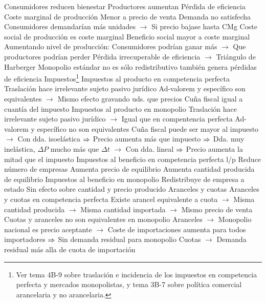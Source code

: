 \documentclass{nuevotema}
\begin{document}
\begin{esquemal}
				\4[] Consumidores reducen bienestar
				\4[] Productores aumentan
			\3 Pérdida de eficiencia
				\4 Coste marginal de producción
				\4[] Menor a precio de venta
				\4 Demanda no satisfecha
				\4[] Consumidores demandarían más unidades
				\4[] $\to$ Si precio bajase hasta CMg
				\4 Coste social de producción es coste marginal
				\4 Beneficio social mayor a coste marginal
				\4[] Aumentando nivel de producción:
				\4[] Consumidores podrían ganar más
				\4[] $\to$ Que productores podrían perder
				\4 Pérdida irrecuperable de eficiencia
				\4[] $\to$ Triángulo de Harberger
				\4[] 
				\4[$\to$] Monopolio estándar no es sólo redistributivo
				\4[] también genera pérdidas de eficiencia
			\3 Impuestos\footnote{Ver tema 4B-9 sobre traslación e incidencia de los impuestos en competencia perfecta y mercados monopolistas, y tema 3B-7 sobre política comercial arancelaria y no arancelaria.}
				\4 Impuestos al producto en competencia perfecta
				\4[] Traslación hace irrelevante sujeto pasivo jurídico
				\4[] Ad-valorem y específico son equivalentes
				\4[] $\to$ Mismo efecto gravando uds. que precios
				\4[] Cuña fiscal igual a cuantía del impuesto
				\4 Impuestos al producto en monopolio
				\4[] Traslación hace irrelevante sujeto pasivo jurídico
				\4[] $\to$ Igual que en compentencia perfecta
				\4[] Ad-valorem y específico no son equivalentes
				\4[] Cuña fiscal puede ser mayor al impuesto
				\4[] $\to$ Con dda. isoelástica
				\4[] $\Rightarrow$ Precio aumenta más que impuesto
				\4[] $\Rightarrow$ Dda. muy inelástica, $\Delta P$ mucho más que $\Delta t$
				\4[] $\to$ Con dda. lineal
				\4[] $\Rightarrow$ Precio aumenta la mitad que el impuesto
				\4 Impuestos al beneficio en competencia perfecta l/p
				\4[] Reduce número de empresas
				\4[] Aumenta precio de equilibrio
				\4[] Aumenta cantidad producida de equilibrio
				\4 Impuestos al beneficio en monopolio
				\4[] Redistribuye de empresa a estado
				\4[] Sin efecto sobre cantidad y precio producido
			\3 Aranceles y cuotas
				\4 Aranceles y cuotas en competencia perfecta
				\4[] Existe arancel equivalente a cuota
				\4[] $\to$ Misma cantidad producida
				\4[] $\to$ Misma cantidad importada
				\4[] $\to$ Mismo precio de venta
				\4 Cuotas y aranceles no son equivalentes en monopolio
				\4[] Aranceles
				\4[] $\to$ Monopolio nacional es precio aceptante
				\4[] $\to$ Coste de importaciones aumenta para todos importadores
				\4[] $\Rightarrow$ Sin demanda residual para monopolio
				\4[] Cuotas
				\4[] $\to$ Demanda residual más alla de cuota de importación

\end{esquemal}
\end{document}
